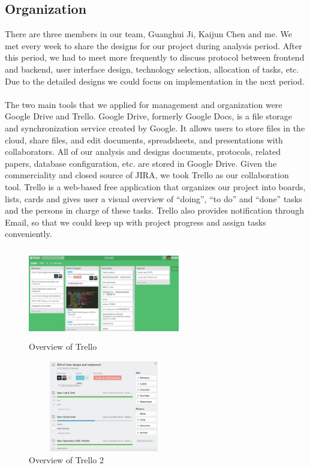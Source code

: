 \documentclass[12pt,oneside,a4paper]{article}
\begin{document}
\subsection{\large Organization}
There are three members in our team, Guanghui Ji, Kaijun Chen and me. We met every week to share the designs for our project during analysis period. After this period, we had to meet more frequently to discuss protocol between frontend and backend, user interface design, technology selection, allocation of tasks, etc. Due to the detailed designs we could focus on implementation in the next period. \\\\
The two main tools that we applied for management and organization were Google Drive and Trello. Google Drive, formerly Google Docs, is a file storage and synchronization service created by Google. It allows users to store files in the cloud, share files, and edit documents, spreadsheets, and presentations with collaborators.
All of our analysis and designs documents, protocols, related papers, database configuration, etc. are stored in Google Drive. Given the commerciality and closed source of JIRA, we took Trello as our collaboration tool. Trello is a web-based free application that organizes our project into boards, lists, cards and gives user a visual overview of ``doing'', ``to do'' and ``done'' tasks and the persons in charge of these tasks. Trello also provides notification through Email, so that we could keep up with project progress and assign tasks conveniently.

\begin{figure}[htb]
\centering
\includegraphics[width=250px, height=150px]{trello.png}
\caption{Overview of Trello}
\label{picture-label}
\end{figure}

\begin{figure}[htb]
\centering
\includegraphics[width=250px, height=150px]{trello2.png}
\caption{Overview of Trello 2}
\label{picture-label2}
\end{figure}
\end{document}
